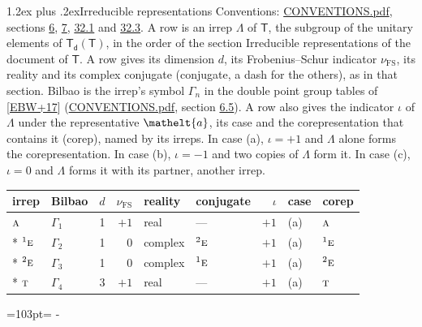 \documentclass[10pt,a4paper]{article}
\makeatletter
\renewcommand\section{\@startsection{section}{1}{\z@}{-3ex plus -1ex minus -.2ex}%
  {1.2ex plus .2ex}{\normalfont\large\sffamily\bfseries\color{parttitle}}}
\newcommand{\needspace}[1]{\par\penalty-100\begingroup\dimen0=#1\relax\dimen2=\pagegoal
  \advance\dimen2-\pagetotal\ifdim\dimen0>\dimen2\relax\ifdim\dimen2>0pt\vfil\break\fi\fi
  \endgroup}
\numberwithin{equation}{section}
\newcommand{\eltfont}[1]{{\let\sigma\eltsigma\mathelt{#1}}}
\newcommand{\grp}[1]{\mathsf{#1}}
\newcommand{\irr}[1]{\text{\normalfont\scshape #1}}
\newcommand{\conjpair}[1]{{}^{#1}}
\newcommand{\elt}[1]{\eltfont{#1}}
\newcommand{\fsind}{\nu_{\mathrm{FS}}}
\makeatother
\begin{document}
\section{Irreducible representations}\label{s:irreps}
Conventions: \href{../../CONVENTIONS.pdf}{CONVENTIONS.pdf}, sections \href{../../../rotation/CONVENTIONS.pdf\#conv.6}{6}, \href{../../../rotation/CONVENTIONS.pdf\#conv.7}{7}, \href{../../CONVENTIONS.pdf\#conv.32.1}{32.1} and \href{../../CONVENTIONS.pdf\#conv.32.3}{32.3}.
\leavevmode\label{n:irrep.Delta}A row is an irrep $\Lambda$ of $\grp{T}$, the subgroup of the unitary elements of $\grp{T_{d}}(\grp{T})$, in the order of the section Irreducible representations of the document of \href{../../../rotation/data/pdf/T.pdf}{$\grp{T}$}. \label{n:index.dimension}\label{n:index.frobenius}\label{n:head.irrep}\label{n:head.reality}\label{n:head.conjugate}A row gives its dimension $d$, its Frobenius--Schur indicator $\fsind$, its reality and its complex conjugate (conjugate, a dash for the others), as in that section. \label{n:head.bilbao}\label{n:irrep.alias.gamma}Bilbao is the irrep's symbol $\Gamma_n$ in the double point group tables of [\href{../../../REFERENCES.pdf\#ref.EBW+17}{EBW+17}] (\href{../../CONVENTIONS.pdf}{CONVENTIONS.pdf}, section \href{../../../rotation/CONVENTIONS.pdf\#conv.6.5}{6.5}). \label{n:head.case.corep}\label{n:head.corep}A row also gives the indicator $\iota$ of $\Lambda$ under the representative $\elt{a}$, its case and the corepresentation that contains it (corep), named by its irreps. In case (a), $\iota = +1$ and $\Lambda$ alone forms the corepresentation. In case (b), $\iota = -1$ and two copies of $\Lambda$ form it. In case (c), $\iota = 0$ and $\Lambda$ forms it with its partner, another irrep.
\setlength{\emergencystretch}{2em}\par\setlength{\emergencystretch}{0pt}
{\small\renewcommand{\arraystretch}{1.25}\setlength{\tabcolsep}{4pt}\begin{longtable}{@{}llrrllrll@{}}\toprule
irrep & Bilbao & $d$ & $\fsind$ & reality & conjugate & $\iota$ & case & corep\\\midrule\endhead
\bottomrule\endfoot\endlastfoot
$\irr{a}$ & $\Gamma_{1}$ & 1 & $+1$ & real & --- & $+1$ & (a) & $\irr{a}$\\*
$\conjpair{1}\irr{e}$ & $\Gamma_{2}$ & 1 & $0$ & complex & $\conjpair{2}\irr{e}$ & $+1$ & (a) & $\conjpair{1}\irr{e}$\\*
$\conjpair{2}\irr{e}$ & $\Gamma_{3}$ & 1 & $0$ & complex & $\conjpair{1}\irr{e}$ & $+1$ & (a) & $\conjpair{2}\irr{e}$\\*
$\irr{t}$ & $\Gamma_{4}$ & 3 & $+1$ & real & --- & $+1$ & (a) & $\irr{t}$\\
\bottomrule\end{longtable}}
\needspace{103pt}
\end{document}
